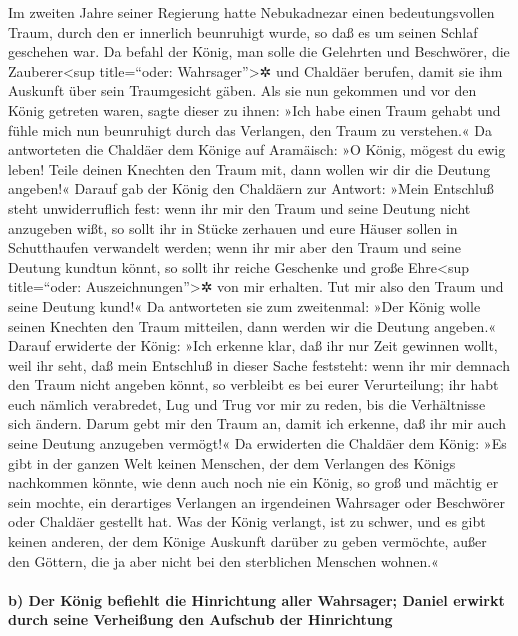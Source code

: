 Im zweiten Jahre seiner Regierung hatte Nebukadnezar einen
bedeutungsvollen Traum, durch den er innerlich beunruhigt wurde, so daß
es um seinen Schlaf geschehen war. Da befahl der König,
man solle die Gelehrten und Beschwörer, die Zauberer\textless sup
title=``oder: Wahrsager''\textgreater✲ und Chaldäer berufen, damit sie
ihm Auskunft über sein Traumgesicht gäben. Als sie nun gekommen und vor
den König getreten waren, sagte dieser zu ihnen: »Ich habe
einen Traum gehabt und fühle mich nun beunruhigt durch das Verlangen,
den Traum zu verstehen.« Da antworteten die Chaldäer dem
Könige auf Aramäisch: »O König, mögest du ewig leben! Teile deinen
Knechten den Traum mit, dann wollen wir dir die Deutung angeben!«
Darauf gab der König den Chaldäern zur Antwort: »Mein
Entschluß steht unwiderruflich fest: wenn ihr mir den Traum und seine
Deutung nicht anzugeben wißt, so sollt ihr in Stücke zerhauen und eure
Häuser sollen in Schutthaufen verwandelt werden; wenn ihr
mir aber den Traum und seine Deutung kundtun könnt, so sollt ihr reiche
Geschenke und große Ehre\textless sup title=``oder:
Auszeichnungen''\textgreater✲ von mir erhalten. Tut mir also den Traum
und seine Deutung kund!« Da antworteten sie zum
zweitenmal: »Der König wolle seinen Knechten den Traum mitteilen, dann
werden wir die Deutung angeben.« Darauf erwiderte der
König: »Ich erkenne klar, daß ihr nur Zeit gewinnen wollt, weil ihr
seht, daß mein Entschluß in dieser Sache feststeht: wenn
ihr mir demnach den Traum nicht angeben könnt, so verbleibt es bei eurer
Verurteilung; ihr habt euch nämlich verabredet, Lug und Trug vor mir zu
reden, bis die Verhältnisse sich ändern. Darum gebt mir den Traum an,
damit ich erkenne, daß ihr mir auch seine Deutung anzugeben vermögt!«
Da erwiderten die Chaldäer dem König: »Es gibt in der
ganzen Welt keinen Menschen, der dem Verlangen des Königs nachkommen
könnte, wie denn auch noch nie ein König, so groß und mächtig er sein
mochte, ein derartiges Verlangen an irgendeinen Wahrsager oder
Beschwörer oder Chaldäer gestellt hat. Was der König
verlangt, ist zu schwer, und es gibt keinen anderen, der dem Könige
Auskunft darüber zu geben vermöchte, außer den Göttern, die ja aber
nicht bei den sterblichen Menschen wohnen.«

\hypertarget{b-der-kuxf6nig-befiehlt-die-hinrichtung-aller-wahrsager-daniel-erwirkt-durch-seine-verheiuxdfung-den-aufschub-der-hinrichtung}{%
\paragraph{b) Der König befiehlt die Hinrichtung aller Wahrsager; Daniel
erwirkt durch seine Verheißung den Aufschub der
Hinrichtung}\label{b-der-kuxf6nig-befiehlt-die-hinrichtung-aller-wahrsager-daniel-erwirkt-durch-seine-verheiuxdfung-den-aufschub-der-hinrichtung}}

